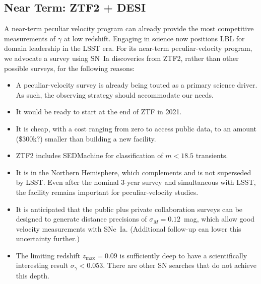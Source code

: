 \documentclass[11pt, oneside]{article}   	%
\begin{document}
\subsection{Near Term: ZTF2 + DESI}
A near-term peculiar velocity program can already provide the most competitive measurements of $\gamma$ at low redshift.  Engaging in science
now positions LBL for domain leadership in the LSST era.  For its near-term peculiar-velocity program, we advocate a survey using SN~Ia discoveries from ZTF2,
rather than other possible surveys, for the following reasons:
\begin{itemize}
\item A peculiar-velocity survey is already being touted as a primary science driver. As such,
the observing strategy should accommodate our needs.
\item It would be ready to start at the end of ZTF in 2021.
\item It is cheap, with a cost ranging from zero to access public data, to an amount (\$300k?) smaller
than building a new facility.
\item ZTF2 includes SEDMachine for classification of $m<18.5$ transients.
\item It is in the Northern Hemisphere, which complements and is not superseded by LSST. 
Even after the nominal 3-year survey and simultaneous with LSST, the facility remains important for peculiar-velocity studies.
\item It is anticipated that the public plus private collaboration surveys can be designed to generate distance
precisions of $\sigma_M =0.12$~mag, which allow good velocity measurements with SNe~Ia.  (Additional follow-up can lower this uncertainty further.)
\item The limiting redshift $z_{\text{max}} =0.09$ is sufficiently deep  to have a scientifically interesting result $\sigma_\gamma < 0.053$.
There are other SN searches that do not achieve this depth.
\end{itemize}
\end{document}
